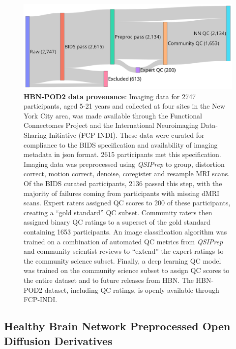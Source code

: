 \documentclass[9pt,lineno]{elife}
\begin{document}
\begin{figure}[tbp]
    \centering
    \includegraphics[width=0.75\linewidth]{hbn-pod2-sankey.png}
    \caption{%
        {\bf HBN-POD2 data provenance}:
        Imaging data for \num{2747} participants, aged 5-21 years and collected at four
        sites in the New York City area, was made available through the
        Functional Connectomes Project and the International Neuroimaging
        Data-Sharing Initiative (FCP-INDI).
        These data were curated for compliance to the BIDS specification
        \citep{gorgolewski2016-lh} and availability of imaging metadata in json
        format. \num{2615} participants met this specification.
        Imaging data was preprocessed using \emph{QSIPrep} \citep{cieslak2021-iq}
        to group, distortion correct, motion correct, denoise, coregister and
        resample MRI scans. Of the BIDS curated participants, \num{2136}
        passed this step, with the majority of failures coming from participants
        with missing dMRI scans.
        Expert raters assigned QC scores to \num{200} of these participants,
        creating a ``gold standard'' QC subset. Community raters then assigned
        binary QC ratings to a superset of the gold standard containing
        \num{1653} participants. An image classification algorithm was trained
        on a combination of automated QC metrics from \emph{QSIPrep} and community
        scientist reviews to ``extend'' the expert ratings to the community
        science subset. Finally, a deep learning QC model was trained on the
        community science subset to assign QC scores to the entire dataset and
        to future releases from HBN.
        The HBN-POD2 dataset, including QC ratings, is openly available through
        FCP-INDI.
    }
    \label{fig:hbn-sankey}
\end{figure}

 
\subsection{Healthy Brain Network Preprocessed Open Diffusion Derivatives}
\end{document}
